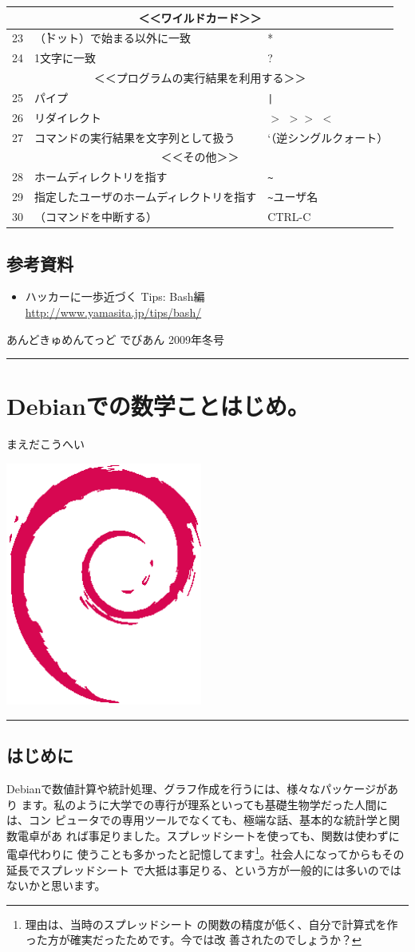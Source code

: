 \documentclass[mingoth,a4paper]{jsarticle}
\renewcommand{\dancersection}[2]{%
\newpage
あんどきゅめんてっど でびあん 2009年冬号
%
\vspace{0.1mm}\\
{\color{dancerlightblue}\rule{\hsize}{2mm}}

%
%
\begin{minipage}[t]{0.6\hsize}
\color{dancerdarkblue}
\vspace{1cm}
\section{#1}
\hfill{}#2\\
\end{minipage}
\begin{minipage}[t]{0.4\hsize}
\vspace{-2cm}
\hfill{}\includegraphics[height=8cm]{image200502/openlogo-nd.eps}\\
\vspace{-5cm}
\end{minipage}
%
%
{\color{dancerdarkblue}\rule{0.74\hsize}{2mm}}
%
\vspace{2cm}
}
\begin{document}
\begin{table}[h]
\begin{center}
\begin{tabular}{|r|l|l|}
\multicolumn{3}{|c|}{＜＜ワイルドカード＞＞}\\ \hline
23 & \.（ドット）で始まる以外に一致 & * \\ \hline
24 & 1文字に一致 & ? \\ \hline
\multicolumn{3}{|c|}{＜＜プログラムの実行結果を利用する＞＞}\\ \hline
25 & パイプ & \verb+|+ \\ \hline
26 & リダイレクト & $>$ $>>$ $<$ \\ \hline
27 & コマンドの実行結果を文字列として扱う & `（逆シングルクォート） \\ \hline
\multicolumn{3}{|c|}{＜＜その他＞＞}\\ \hline
28 & ホームディレクトリを指す & \verb+~+ \\ \hline
29 & 指定したユーザのホームディレクトリを指す & \verb+~+ユーザ名 \\ \hline
30 & （コマンドを中断する） & CTRL-C \\ \hline
\end{tabular}
\label{sonota} 
\end{center}
\end{table}

\subsection{参考資料}

\begin{itemize}
 \item ハッカーに一歩近づく Tips: Bash編\\
       \url{http://www.yamasita.jp/tips/bash/}
\end{itemize}

\dancersection{Debianでの数学ことはじめ。}{まえだこうへい}

\subsection{はじめに}

Debianで数値計算や統計処理、グラフ作成を行うには、様々なパッケージがあり
ます。私のように大学での専行が理系といっても基礎生物学だった人間には、コン
ピュータでの専用ツールでなくても、極端な話、基本的な統計学と関数電卓があ
れば事足りました。スプレッドシートを使っても、関数は使わずに電卓代わりに
使うことも多かったと記憶してます\footnote{理由は、当時のスプレッドシート
の関数の精度が低く、自分で計算式を作った方が確実だったためです。今では改
善されたのでしょうか？}。社会人になってからもその延長でスプレッドシート
で大抵は事足りる、という方が一般的には多いのではないかと思います。
\end{document}
